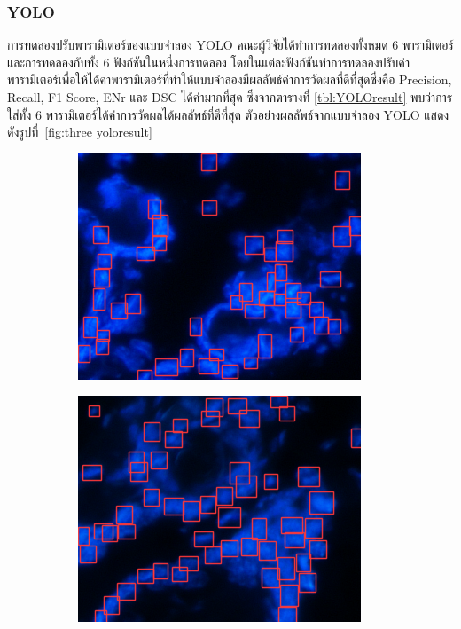\documentclass[12pt,oneside,openright,a4paper]{cpe-thai-project}
\begin{document}
\subsubsection{YOLO}
การทดลองปรับพารามิเตอร์ของแบบจำลอง YOLO คณะผู้วิจัยได้ทำการทดลองทั้งหมด 6 พารามิเตอร์และการทดลองกับทั้ง 6 ฟังก์ชันในหนึ่งการทดลอง โดยในแต่ละฟังก์ชันทำการทดลองปรับค่าพารามิเตอร์เพื่อให้ได้ค่าพารามิเตอร์ที่ทำให้แบบจำลองมีผลลัพธ์ค่าการวัดผลที่ดีที่สุดซึ่งคือ Precision, Recall, F1 Score, ENr และ DSC ได้ค่ามากที่สุด ซึ่งจากตารางที่ \ref{tbl:YOLOresult}  พบว่าการใส่ทั้ง 6 พารามิเตอร์ได้ค่าการวัดผลได้ผลลัพธ์ที่ดีที่สุด ตัวอย่างผลลัพธ์จากแบบจำลอง YOLO แสดงดังรูปที่~\ref{fig:three yoloresult}
\begin{figure}[!h]
     \centering
     \begin{subfigure}[b]{0.3\textwidth}
         \centering
         \includegraphics[width=\textwidth]{images/yoloresult.png}
     \end{subfigure}
     \hfill
     \begin{subfigure}[b]{0.3\textwidth}
         \centering
         \includegraphics[width=\textwidth]{images/yoloresult2.png}

\end{subfigure}
\end{figure}
\end{document}
